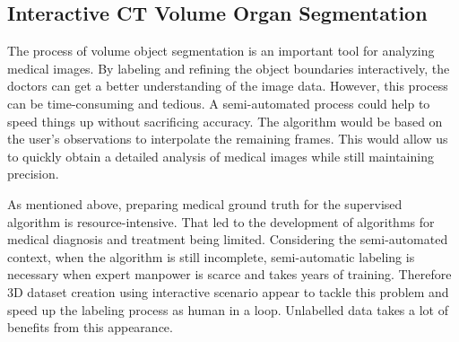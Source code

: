 \subsection{Interactive CT Volume Organ Segmentation}
The process of volume object segmentation is an important tool for analyzing medical images. By labeling and refining the object boundaries interactively, the doctors can get a better understanding of the image data. However, this process can be time-consuming and tedious. A semi-automated process could help to speed things up without sacrificing accuracy. The algorithm would be based on the user's observations to interpolate the remaining frames. This would allow us to quickly obtain a detailed analysis of medical images while still maintaining precision.

As mentioned above, preparing medical ground truth for the supervised algorithm is resource-intensive. That led to the development of algorithms for medical diagnosis and treatment being limited. Considering the semi-automated context, when the algorithm is still incomplete, semi-automatic labeling is necessary when expert manpower is scarce and takes years of training. Therefore 3D dataset creation using interactive scenario appear to tackle this problem and speed up the labeling process as human in a loop. Unlabelled data takes a lot of benefits from this appearance.

